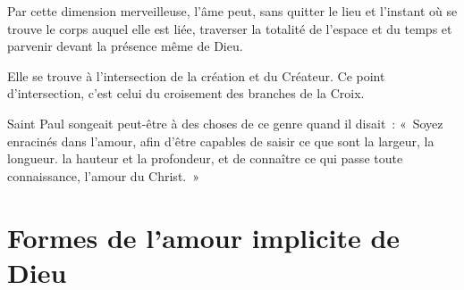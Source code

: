 \documentclass[french,twoside]{book} %
\newcommand\chapteropen{} %
\newcommand\chapterclose{} %
\begin{document}
Par cette dimension merveilleuse, l'âme peut, sans quitter le lieu et l'instant où se trouve le corps auquel elle est liée, traverser la totalité de l'espace et du temps et parvenir devant la présence même de Dieu.\par
Elle se trouve à l'intersection de la création et du Créateur. Ce point d'intersection, c'est celui du croisement des branches de la Croix.\par
Saint Paul songeait peut-être à des choses de ce genre quand il disait : « Soyez enracinés dans l'amour, afin d'être capables de saisir ce que sont la largeur, la longueur. la hauteur et la profondeur, et de connaître ce qui passe toute connaissance, l'amour du Christ. »\par

\begin{center}
\noindent \centerline{}
\end{center}

\chapterclose


\chapteropen
\chapter[{Formes de l'amour implicite de Dieu}]{Formes de l'amour implicite de Dieu}
\end{document}
